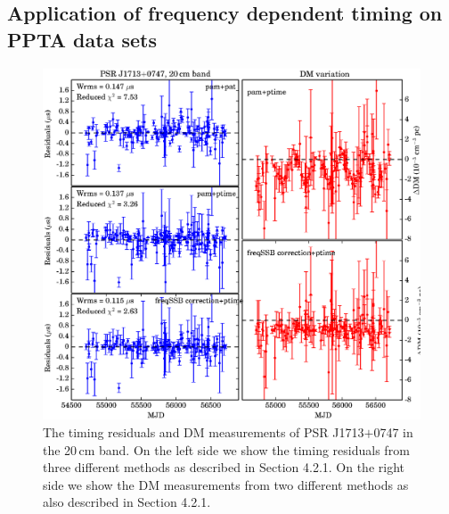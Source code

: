 \documentclass[useAMS,usenatbib]{mn2e}
\begin{document}
\begin{appendix}
\section{Application of frequency dependent timing on PPTA data sets}
\begin{figure}
\center
\includegraphics[width=6 in]{1713.ps}
\caption{The timing residuals and DM measurements of PSR J1713$+$0747 in the 20\,cm band. 
On the left side we show the timing residuals from three different methods as described in 
Section 4.2.1. On the right side we show the DM measurements from two different methods 
as also described in Section 4.2.1.  
}
\label{1713resi}
\end{figure}
%
\begin{figure}
\center

\end{figure}
\end{appendix}
\end{document}
